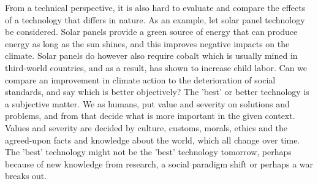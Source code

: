 From a technical perspective, it is also hard to evaluate and compare the effects of a technology that differs in nature. As an example, let solar panel technology be considered.
Solar panels provide a green source of energy that can produce energy as long as the sun shines, and this improves negative impacts on the climate.
Solar panels do however also require cobalt which is usually mined in third-world countries, and as a result, has shown to increase child labor.
Can we compare an improvement in climate action to the deterioration of social standards, and say which is better objectively?
The 'best' or better technology is a subjective matter. We as humans, put value and severity on solutions and problems, and from that decide what is more important in the given context.
Values and severity are decided by culture, customs, morals, ethics and the agreed-upon facts and knowledge about the world, which all change over time. 
The 'best' technology might not be the 'best' technology tomorrow, perhaps because of new knowledge from research, a social paradigm shift or perhaps a war breaks out.


\newpage